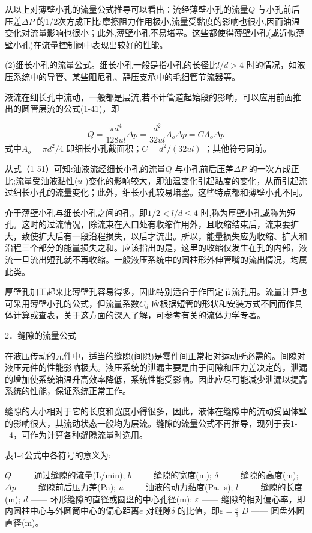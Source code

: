 从以上对薄壁小孔的流量公式推导可以看出：流经薄壁小孔的流量$ Q $ 与小孔前后压差$ \varDelta P $ 的1/2次方成正比;摩擦阻力作用极小,流量受黏度的影响也很小,因而油温变化对流量影响也很小；此外,薄壁小孔不易堵塞。这些都使得薄壁小孔(或近似薄壁小孔)在流量控制阀中表现出较好的性能。

(2)细长小孔的流量公式。细长小孔一般是指小孔的长径比$ l/d>4 $ 时的情况，如液压系统中的导管、某些阻尼孔、静压支承中的毛细管节流器等。

液流在细长孔中流动，一般都是层流,若不计管道起始段的影响，可以应用前面推出的圆管层流的公式(1-41)，即

$$ Q=\frac{\pi d^4}{128ul}\varDelta p=\frac{d^2}{32ul}A_o\varDelta p=CA_o\varDelta p $$
\noindent 式中$ A_o=\pi d^2/4 $ 即细长小孔截面积；$ C=d^2/\left( 32ul \right)  $ ；其他符号同前。

从式（1-51）可知:油液流经细长小孔的流量$ Q $ 与小孔前后压差$ \varDelta P $ 的一次方成正比;流量受油液黏性($ u $ )变化的影响较大，即油温变化引起黏度的变化，从而引起流过细长小孔的流量变化；此外，细长小孔较易堵塞。这些特点都和薄壁小孔不同。

介于薄壁小孔与细长小孔之间的孔，即$ 1/2<l/d\le 4 $ 时,称为厚壁小孔或称为短孔。这时的过流情况，除流束在入口处有收缩作用外，且收缩结束后，流束要扩大，致使扩大后有一段沿程损失，以后才流出。所以，能量损失应为收缩、扩大和沿程三个部分的能量损失之和。应该指出的是，这里的收缩仅发生在孔的内部，液流一旦流出短孔就不再收缩。一般液压系统中的圆柱形外伸管嘴的流出情况，均属此类。

厚壁孔加工起来比薄壁孔容易得多，因此特别适合于作固定节流孔用。流量计算也可采用薄壁小孔的公式，但流量系数$ C_d $ 应根据短管的形状和安装方式不同而作具体计算或查表，关于这方面的深入了解，可参考有关的流体力学专著。

2．缝隙的流量公式

在液压传动的元件中，适当的缝隙(间隙)是零件间正常相对运动所必需的。间隙对液压元件的性能影响极大。液压系统的泄漏主要是由于间隙和压力差决定的，泄漏的增加使系统油温升高效率降低，系统性能受影响。因此应尽可能减少泄漏以提高系统的性能，保证系统正常工作。

缝隙的大小相对于它的长度和宽度小得很多，因此，液体在缝隙中的流动受固体壁的影响很大，其流动状态一般均为层流。缝隙的流量公式不再推导，现列于表1- 4，可作为计算各种缝隙流量时选用。

表1-4公式中各符号的意义为:

$ Q $  —— 通过缝隙的流量(L/min);
$ b $  —— 缝隙的宽度(m);
$ \delta  $  —— 缝隙的高度(m);
$ \varDelta p $  —— 缝隙前后压力差(Pa);
$ u $  —— 油液的动力黏度(Pa. s);
$ l $  ——  缝隙的长度(m);
$ d $  —— 环形缝隙的直径或圆盘的中心孔径(m);
$ \varepsilon  $  —— 缝隙的相对偏心率，即内圆柱中心与外圆筒中心的偏心距离$ e $ 对缝隙$ \delta  $ 的比值，即$ \varepsilon =\frac{e}{\delta} $ 
$ D $  —— 圆盘外圆直径(m)。

